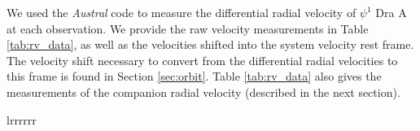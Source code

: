 \documentclass[twocolumn]{emulateapj}
\begin{document}
We used the \emph{Austral} code \citep{Endl2000} to measure the differential radial velocity of $\psi^1$ Dra A at each observation. We provide the raw velocity measurements in Table \ref{tab:rv_data}, as well as the velocities shifted into the system velocity rest frame. The velocity shift necessary to convert from the differential radial velocities to this frame is found in Section \ref{sec:orbit}. Table \ref{tab:rv_data} also gives the measurements of the companion radial velocity (described in the next section).



\begin{deluxetable}{lrrrrrr}
\tabletypesize{\footnotesize}
\tablewidth{0pt}

\startdata


\end{deluxetable}
\end{document}
